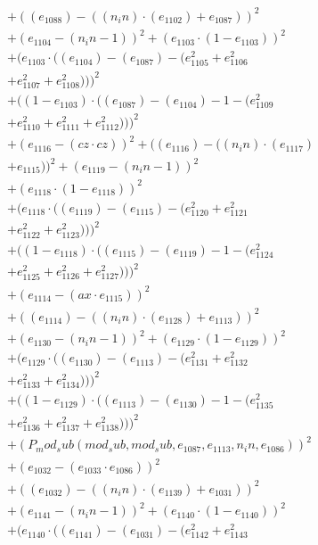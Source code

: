 \documentclass[10pt, a4paper]{article}
\begin{document}
\begin{small}
\begin{align*}
& + ((e_{1088}) - ((n_in)  \cdot  (e_{1102}) + e_{1087}))^{2} \\
& + (e_{1104} - (n_in - 1))^{2} + (e_{1103}  \cdot  (1 - e_{1103}))^{2} \\
& + (e_{1103}  \cdot  ((e_{1104}) - (e_{1087}) - (e_{1105}^{2} + e_{1106}^{2} \\
& + e_{1107}^{2} + e_{1108}^{2})))^{2} \\
& + ((1 - e_{1103})  \cdot  ((e_{1087}) - (e_{1104}) - 1 - (e_{1109}^{2} \\
& + e_{1110}^{2} + e_{1111}^{2} + e_{1112}^{2})))^{2} \\
& + (e_{1116} - (cz  \cdot  cz))^{2} + ((e_{1116}) - ((n_in)  \cdot  (e_{1117}) \\
& + e_{1115}))^{2} + (e_{1119} - (n_in - 1))^{2} \\
& + (e_{1118}  \cdot  (1 - e_{1118}))^{2} \\
& + (e_{1118}  \cdot  ((e_{1119}) - (e_{1115}) - (e_{1120}^{2} + e_{1121}^{2} \\
& + e_{1122}^{2} + e_{1123}^{2})))^{2} \\
& + ((1 - e_{1118})  \cdot  ((e_{1115}) - (e_{1119}) - 1 - (e_{1124}^{2} \\
& + e_{1125}^{2} + e_{1126}^{2} + e_{1127}^{2})))^{2} \\
& + (e_{1114} - (ax  \cdot  e_{1115}))^{2} \\
& + ((e_{1114}) - ((n_in)  \cdot  (e_{1128}) + e_{1113}))^{2} \\
& + (e_{1130} - (n_in - 1))^{2} + (e_{1129}  \cdot  (1 - e_{1129}))^{2} \\
& + (e_{1129}  \cdot  ((e_{1130}) - (e_{1113}) - (e_{1131}^{2} + e_{1132}^{2} \\
& + e_{1133}^{2} + e_{1134}^{2})))^{2} \\
& + ((1 - e_{1129})  \cdot  ((e_{1113}) - (e_{1130}) - 1 - (e_{1135}^{2} \\
& + e_{1136}^{2} + e_{1137}^{2} + e_{1138}^{2})))^{2} \\
& + (P_mod_sub(mod_sub, mod_sub, e_{1087}, e_{1113}, n_in, e_{1086}))^{2} \\
& + (e_{1032} - (e_{1033}  \cdot  e_{1086}))^{2} \\
& + ((e_{1032}) - ((n_in)  \cdot  (e_{1139}) + e_{1031}))^{2} \\
& + (e_{1141} - (n_in - 1))^{2} + (e_{1140}  \cdot  (1 - e_{1140}))^{2} \\
& + (e_{1140}  \cdot  ((e_{1141}) - (e_{1031}) - (e_{1142}^{2} + e_{1143}^{2} \\

\end{align*}
\end{small}
\end{document}
